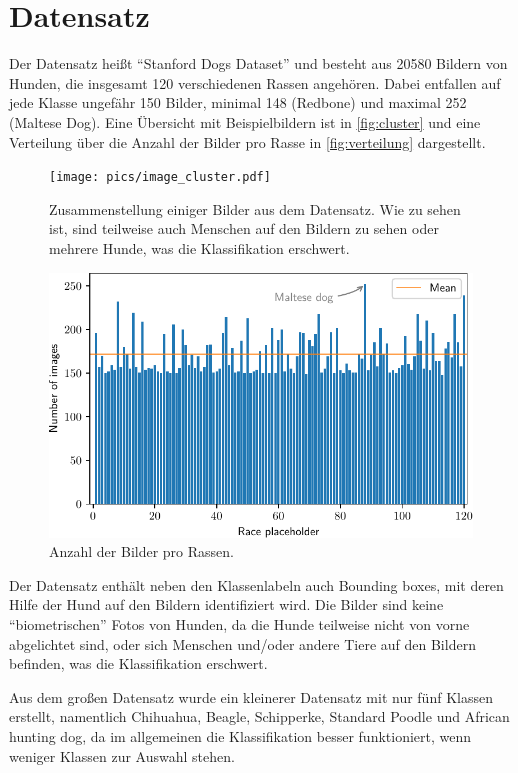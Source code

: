\section{Datensatz}
\label{chap:datensatz}
Der Datensatz heißt \enquote{Stanford Dogs Dataset}\cite{datensatz} und besteht
aus 20580 Bildern von Hunden, die insgesamt 120 verschiedenen Rassen angehören.
Dabei entfallen auf jede Klasse ungefähr 150 Bilder, minimal 148 (Redbone) und
maximal 252 (Maltese Dog). Eine Übersicht mit Beispielbildern ist in
\autoref{fig:cluster} und eine Verteilung über die Anzahl der Bilder pro Rasse
in \autoref{fig:verteilung} dargestellt.

\begin{figure}
  \centering
  \texttt{[image: pics/image\_cluster.pdf]}
  \caption{Zusammenstellung einiger Bilder aus dem Datensatz. Wie zu sehen ist,
  sind teilweise auch Menschen auf den Bildern zu sehen oder mehrere Hunde,
  was die Klassifikation erschwert.}
  \label{fig:cluster}
\end{figure}

\begin{figure}
  \centering
  \includegraphics[scale=0.8]{pics/image_distribution.pdf}
  \caption{Anzahl der Bilder pro Rassen.}
  \label{fig:verteilung}
\end{figure}

Der Datensatz enthält neben den Klassenlabeln auch Bounding boxes, mit deren
Hilfe der Hund auf den Bildern identifiziert wird. Die Bilder sind keine
\enquote{biometrischen} Fotos von Hunden, da die Hunde teilweise nicht von vorne
abgelichtet sind, oder sich Menschen und/oder andere Tiere auf den Bildern
befinden, was die Klassifikation erschwert.

Aus dem großen Datensatz wurde ein kleinerer Datensatz mit nur fünf Klassen
erstellt, namentlich Chihuahua, Beagle, Schipperke, Standard Poodle und African
hunting dog, da im allgemeinen die Klassifikation besser funktioniert, wenn
weniger Klassen zur Auswahl stehen.
